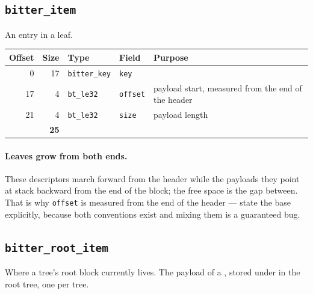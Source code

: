 \subsection{\texttt{bitter\_item}}

An entry in a leaf.

\begin{center}
\begin{tabular}{rrllp{6cm}}
  \toprule
  Offset & Size & Type & Field & Purpose \\
  \midrule
  0  & 17 & \texttt{bitter\_key} & \texttt{key}    & \\
  17 & 4  & \texttt{bt\_le32}    & \texttt{offset} & payload start, measured from the end of the header \\
  21 & 4  & \texttt{bt\_le32}    & \texttt{size}   & payload length \\
  \midrule
  \multicolumn{2}{r}{\textbf{25}} & & & \\
  \bottomrule
\end{tabular}
\end{center}

\paragraph{Leaves grow from both ends.} These descriptors march forward from the
header while the payloads they point at stack backward from the end of the
block; the free space is the gap between. That is why \texttt{offset} is
measured from the end of the header --- state the base explicitly, because both
conventions exist and mixing them is a guaranteed bug.


\subsection{\texttt{bitter\_root\_item}}

Where a tree's root block currently lives. The payload of a
, stored under  in the
root tree, one per tree.


